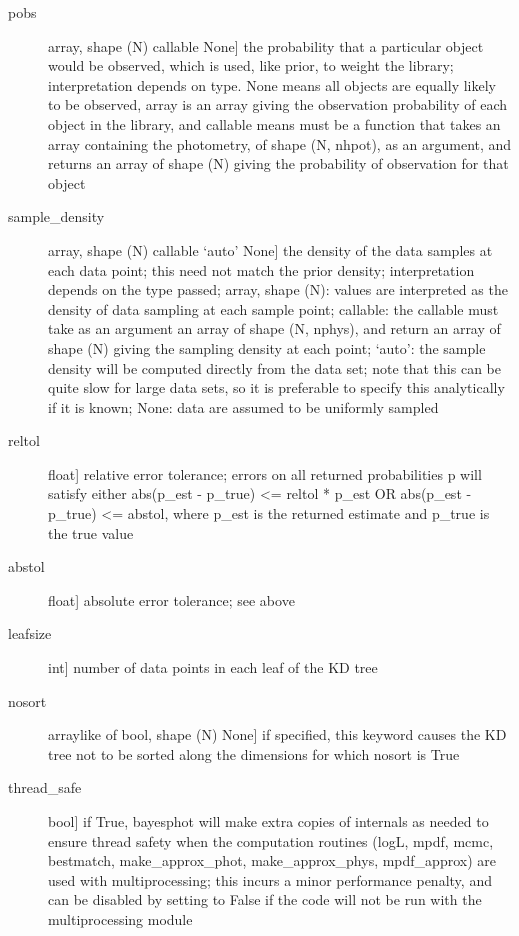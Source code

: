 \documentclass[letterpaper,10pt,english]{sphinxmanual}
\begin{document}
\begin{fulllineitems}
\begin{fulllineitems}
\begin{description}
\begin{description}
\item[{pobs}] \leavevmode{[}array, shape (N) \textbar{} callable \textbar{} None{]}
the probability that a particular object would be observed,
which is used, like prior, to weight the library;
interpretation depends on type. None means all objects are
equally likely to be observed, array is an array giving the
observation probability of each object in the library, and
callable means must be a function that takes an array
containing the photometry, of shape (N, nhpot), as an
argument, and returns an array of shape (N) giving the
probability of observation for that object

\item[{sample\_density}] \leavevmode{[}array, shape (N) \textbar{} callable \textbar{} ‘auto’ \textbar{} None{]}
the density of the data samples at each data point; this
need not match the prior density; interpretation depends
on the type passed; array, shape (N): values are
interpreted as the density of data sampling at each
sample point; callable: the callable must take as an
argument an array of shape (N, nphys), and return an
array of shape (N) giving the sampling density at each
point; ‘auto’: the sample density will be computed
directly from the data set; note that this can be quite
slow for large data sets, so it is preferable to specify
this analytically if it is known; None: data are assumed
to be uniformly sampled

\item[{reltol}] \leavevmode{[}float{]}
relative error tolerance; errors on all returned
probabilities p will satisfy either
abs(p\_est - p\_true) \textless{}= reltol * p\_est   OR
abs(p\_est - p\_true) \textless{}= abstol,
where p\_est is the returned estimate and p\_true is the
true value

\item[{abstol}] \leavevmode{[}float{]}
absolute error tolerance; see above

\item[{leafsize}] \leavevmode{[}int{]}
number of data points in each leaf of the KD tree

\item[{nosort}] \leavevmode{[}arraylike of bool, shape (N) \textbar{} None{]}
if specified, this keyword causes the KD tree not to be
sorted along the dimensions for which nosort is True

\item[{thread\_safe}] \leavevmode{[}bool{]}
if True, bayesphot will make extra copies of internals
as needed to ensure thread safety when the computation
routines (logL, mpdf, mcmc, bestmatch, make\_approx\_phot,
make\_approx\_phys, mpdf\_approx) are used with
multiprocessing; this incurs a minor performance
penalty, and can be disabled by setting to False if the
code will not be run with the multiprocessing module


\end{description}
\end{description}
\end{fulllineitems}
\end{fulllineitems}
\end{document}
